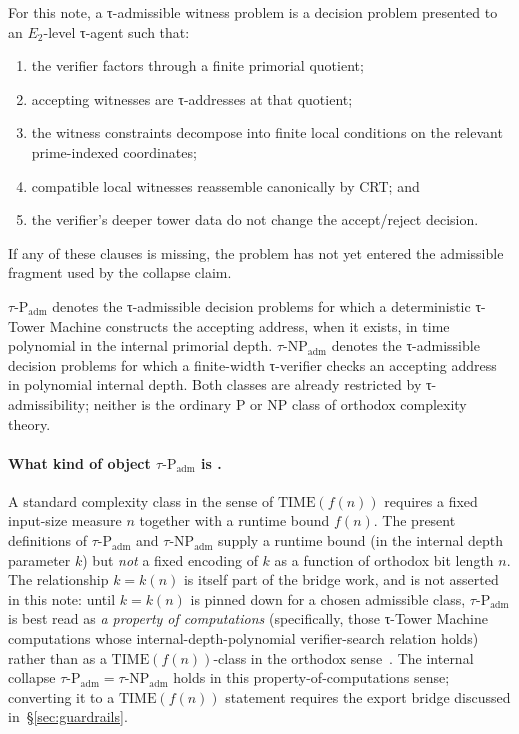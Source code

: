 \documentclass{pantarhei-researchnote}
\newcommand{\Padm}{\ensuremath{\tau\text{-}\mathrm{P}_{\mathrm{adm}}}}
\newcommand{\NPadm}{\ensuremath{\tau\text{-}\mathrm{NP}_{\mathrm{adm}}}}
\newcommand{\Etwo}{\ensuremath{E_2}}
\newcommand{\ClassP}{\ensuremath{\mathrm{P}}}
\newcommand{\ClassNP}{\ensuremath{\mathrm{NP}}}
\begin{document}
\begin{definition}
For this note, a τ-admissible witness problem is a decision problem
presented to an \Etwo-level τ-agent such that:
\begin{enumerate}[leftmargin=1.2em,itemsep=1pt,topsep=2pt]
\item the verifier factors through a finite primorial quotient;
\item accepting witnesses are τ-addresses at that quotient;
\item the witness constraints decompose into finite local conditions on
the relevant prime-indexed coordinates;
\item compatible local witnesses reassemble canonically by CRT; and
\item the verifier's deeper tower data do not change the accept/reject
decision.
\end{enumerate}
If any of these clauses is missing, the problem has not yet entered the
admissible fragment used by the collapse claim.
\end{definition}

\begin{definition}[The classes \texorpdfstring{\(\Padm\)}{tau-Padm} and \texorpdfstring{\(\NPadm\)}{tau-NPadm} \scopetau]
\(\Padm\) denotes the τ-admissible decision problems for which a
deterministic τ-Tower Machine constructs the accepting address, when it
exists, in time polynomial in the internal primorial depth. \(\NPadm\)
denotes the τ-admissible decision problems for which a finite-width
τ-verifier checks an accepting address in polynomial internal depth. Both
classes are already restricted by τ-admissibility; neither is the
ordinary \(\ClassP\) or \(\ClassNP\) class of orthodox complexity theory.
\end{definition}

\paragraph{What kind of object \(\Padm\) is \scopetau.}
A standard complexity class in the sense of $\mathrm{TIME}(f(n))$ requires
a fixed input-size measure $n$ together with a runtime bound $f(n)$. The
present definitions of $\Padm$ and $\NPadm$ supply a runtime bound (in
the internal depth parameter $k$) but \emph{not} a fixed encoding of $k$
as a function of orthodox bit length $n$. The relationship $k = k(n)$ is
itself part of the bridge work, and is not asserted in this note: until
$k = k(n)$ is pinned down for a chosen admissible class, $\Padm$ is best
read as \emph{a property of computations} (specifically, those τ-Tower
Machine computations whose internal-depth-polynomial verifier-search
relation holds) rather than as a $\mathrm{TIME}(f(n))$-class in the
orthodox sense~\cite{KrajicekProofComplexity}. The internal collapse
$\Padm = \NPadm$ holds in this property-of-computations sense; converting
it to a $\mathrm{TIME}(f(n))$ statement requires the export bridge
discussed in~\S\ref{sec:guardrails}.
\end{document}
